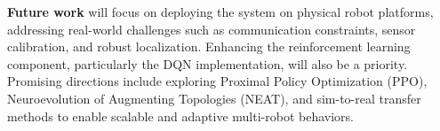 \textbf{Future work} will focus on deploying the system on physical robot platforms, addressing real-world challenges such as communication constraints, sensor calibration, and robust localization. Enhancing the reinforcement learning component, particularly the DQN implementation, will also be a priority. Promising directions include exploring Proximal Policy Optimization (PPO), Neuroevolution of Augmenting Topologies (NEAT), and sim-to-real transfer methods to enable scalable and adaptive multi-robot behaviors.
